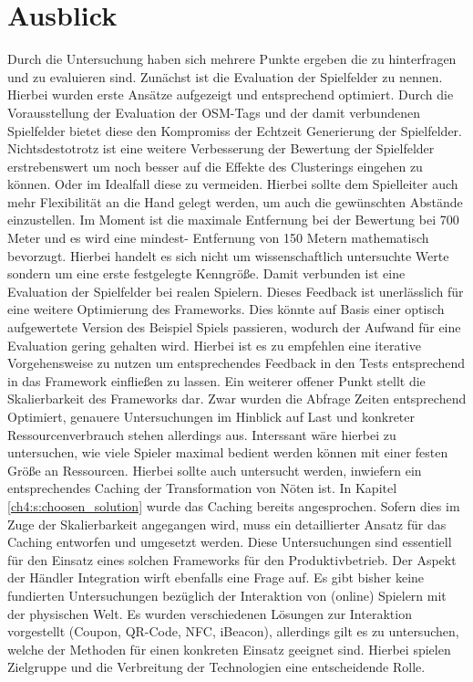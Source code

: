 \section{Ausblick}

Durch die Untersuchung haben sich mehrere Punkte ergeben die zu hinterfragen und zu evaluieren sind. Zunächst ist die Evaluation der Spielfelder zu nennen. Hierbei wurden erste Ansätze aufgezeigt und entsprechend optimiert. Durch die Vorausstellung der Evaluation der OSM-Tags und der damit verbundenen Spielfelder bietet diese den Kompromiss der Echtzeit Generierung der Spielfelder. Nichtsdestotrotz ist eine weitere Verbesserung der Bewertung der Spielfelder erstrebenswert um noch besser auf die Effekte des Clusterings eingehen zu können. Oder im Idealfall diese zu vermeiden. Hierbei sollte dem Spielleiter auch mehr Flexibilität an die Hand gelegt werden, um auch die gewünschten Abstände einzustellen. Im Moment ist die maximale Entfernung bei der Bewertung bei 700 Meter und es wird eine mindest- Entfernung von 150 Metern  mathematisch bevorzugt. Hierbei handelt es sich nicht um wissenschaftlich untersuchte Werte sondern um eine erste festgelegte Kenngröße.
Damit verbunden ist eine Evaluation der Spielfelder bei realen Spielern. Dieses Feedback ist unerlässlich für eine weitere Optimierung des Frameworks. Dies könnte auf Basis einer optisch aufgewertete Version des Beispiel Spiels passieren, wodurch der Aufwand für eine Evaluation gering gehalten wird.
Hierbei ist es zu empfehlen eine iterative Vorgehensweise zu nutzen um entsprechendes Feedback in den Tests entsprechend in das Framework einfließen zu lassen.
Ein weiterer offener Punkt stellt die Skalierbarkeit des Frameworks dar. Zwar wurden die Abfrage Zeiten entsprechend Optimiert, genauere Untersuchungen im Hinblick auf Last und konkreter Ressourcenverbrauch stehen allerdings aus. Interssant wäre hierbei zu untersuchen, wie viele Spieler maximal bedient werden können mit einer festen Größe an Ressourcen. Hierbei sollte auch untersucht werden, inwiefern ein entsprechendes Caching der Transformation von Nöten ist. In Kapitel \ref{ch4:s:choosen_solution} wurde das Caching bereits angesprochen. Sofern dies im Zuge der Skalierbarkeit angegangen wird, muss ein detaillierter Ansatz für das Caching entworfen und umgesetzt werden. 
Diese Untersuchungen sind essentiell für den Einsatz eines solchen Frameworks für den Produktivbetrieb.
Der Aspekt der Händler Integration wirft ebenfalls eine Frage auf. Es gibt bisher keine fundierten Untersuchungen bezüglich der Interaktion von (online) Spielern mit der physischen Welt. Es wurden verschiedenen Lösungen zur Interaktion vorgestellt (Coupon, QR-Code, NFC, iBeacon), allerdings gilt es zu untersuchen, welche der Methoden für einen konkreten Einsatz geeignet sind. Hierbei spielen Zielgruppe und die Verbreitung der Technologien eine entscheidende Rolle.
